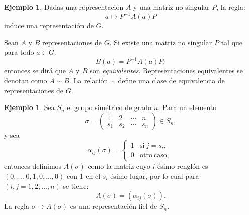\documentclass[12pt]{book}
\theoremstyle{definition}
\newtheorem{example}[theorem]{Ejemplo}
\newcounter{in}
\newcounter{ini}
\begin{document}
\begin{example}
  \label{Ej5}
  Dadas una representación $A$ y una matriz no singular $P$, la regla:
  \begin{equation*}
    a \mapsto P^{-1}A\left(a\right)P
  \end{equation*}  
  induce una representación de $G$.

  Sean $A$ y $B$ representaciones de $G$. Si existe una
  matriz no singular $P$ tal que para todo $a \in G$:
  \begin{equation*}
    B\left(a\right)= P^{-1}A\left(a\right)P,
  \end{equation*}
  entonces se dirá que $A$ y $B$ son \emph{equivalentes}. Representaciones
  equivalentes se denotan como $A \sim B$. La relación $\sim$ define
  una clase de equivalencia de representaciones de $G$.
\end{example}

\begin{example}
  \label{Ej3}
  Sea $S_{n}$ el grupo simétrico de grado
  $n$. Para un elemento
  \begin{equation}
    \label{eq:1}
    \sigma =
    \begin{pmatrix}
      1 & 2 & \cdots  & n\\
      s_{1} & s_{2} & \cdots & s_{n}
    \end{pmatrix} 
    \in S_{n},
  \end{equation}
  y sea
  \begin{equation*}
    \alpha_{ij}\left(\sigma\right) = \left\{
      \begin{array}{ll}
        1      & \mathrm{si\ } j = s_{i}, \\
        0      & \mathrm{otro\ caso,\ } 
      \end{array}
    \right.
  \end{equation*}
  entonces definimos $A\left(\sigma\right)$ como la matriz cuyo
  $i$-ésimo renglón es $\left(0,...,0,1,0,...,0\right)$ con 1 en el
  $s_{i}$-ésimo lugar, por lo cual para $\left(i,j=1,2,...,n\right)$
  se tiene:
  \begin{equation*}
    A\left(\sigma\right) = \left(\alpha_{ij}\left(\sigma\right)\right).
  \end{equation*}
  La regla $\sigma \mapsto A\left(\sigma\right)$ es una representación
  fiel de $S_{n}$.
\end{example}
\end{document}
